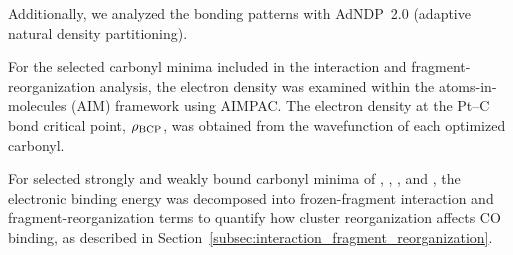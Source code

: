 Additionally, we analyzed the bonding patterns with AdNDP~2.0 (adaptive natural density
partitioning)\cite{zubarev:adndp:2008,tkachenko:adndp2:2019}.

For the selected carbonyl minima included in the interaction and
fragment-reorganization analysis, the electron density was examined within the
atoms-in-molecules (AIM) framework using AIMPAC\cite{aimpac,biegler:extreme:1981,biegler:proaim:1982}.
The electron density at the Pt--C bond critical point, $\rho_{\rm BCP}$, was
obtained from the wavefunction of each optimized carbonyl.

For selected strongly and weakly bound carbonyl minima of ,
, , and , the electronic binding energy was decomposed into frozen-fragment interaction and fragment-reorganization terms to quantify how cluster reorganization affects
CO binding, as described in Section~\ref{subsec:interaction_fragment_reorganization}.
